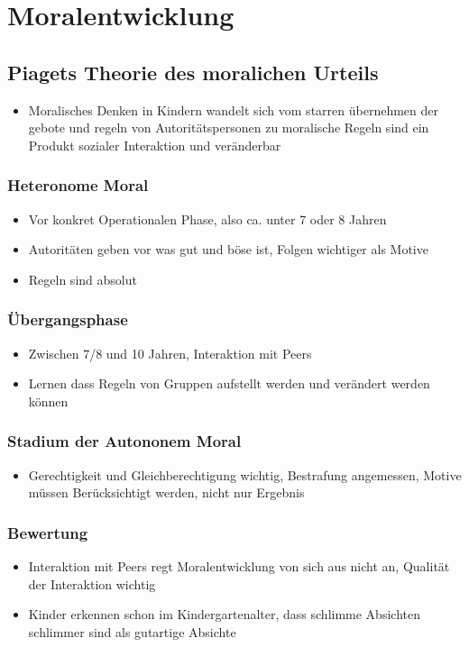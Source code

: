 \section{Moralentwicklung}
\subsection{Piagets Theorie des moralichen Urteils}
\begin{itemize}
	\item
		Moralisches Denken in Kindern wandelt sich vom starren übernehmen der gebote und regeln von Autoritätspersonen zu moralische Regeln sind ein Produkt sozialer Interaktion und veränderbar
\end{itemize}
\subsubsection{Heteronome Moral}
\begin{itemize}
	\item
		Vor konkret Operationalen Phase, also ca. unter 7 oder 8 Jahren
	\item
		Autoritäten geben vor was gut und böse ist, Folgen wichtiger als Motive
	\item
		Regeln sind absolut
\end{itemize}
\subsubsection{Übergangsphase}
\begin{itemize}
	\item
		Zwischen 7/8 und 10 Jahren, Interaktion mit Peers
	\item
		Lernen dass Regeln von Gruppen aufstellt werden und verändert werden können
\end{itemize}
\subsubsection{Stadium der Autononem Moral}
\begin{itemize}
	\item
		Gerechtigkeit und Gleichberechtigung wichtig, Bestrafung angemessen, Motive müssen Berücksichtigt werden, nicht nur Ergebnis
\end{itemize}
\subsubsection{Bewertung}
\begin{itemize}
	\item
		Interaktion mit Peers regt Moralentwicklung von sich aus nicht an, Qualität der Interaktion wichtig
	\item
		Kinder erkennen schon im Kindergartenalter, dass schlimme Absichten schlimmer sind als gutartige Absichte
\end{itemize}

